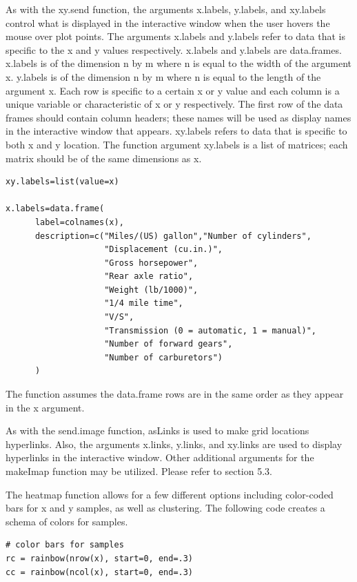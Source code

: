 \documentclass[]{article}
\begin{document}
\indent As with the xy.send function, the arguments x.labels, y.labels, and xy.labels control what is displayed in the interactive window when the user hovers the mouse over plot points. The arguments x.labels and y.labels refer to data that is specific to the x and y values respectively. x.labels and y.labels are data.frames. x.labels is of the dimension n by m where n is equal to the width of the argument x. y.labels is of the dimension n by m where n is equal to the length of the argument x. Each row is specific to a certain x or y value and each column is a unique variable or characteristic of x or y respectively.  The first row of the data frames should contain column headers; these names will be used as display names in the interactive window that appears. xy.labels refers to data that is specific to both x and y location. The function argument xy.labels is a list of matrices; each matrix should be of the same dimensions as x.

\begin{verbatim}
xy.labels=list(value=x)

x.labels=data.frame(
      label=colnames(x),
      description=c("Miles/(US) gallon","Number of cylinders",
                    "Displacement (cu.in.)",
                    "Gross horsepower",
                    "Rear axle ratio",
                    "Weight (lb/1000)",
                    "1/4 mile time",
                    "V/S",
                    "Transmission (0 = automatic, 1 = manual)",
                    "Number of forward gears",
                    "Number of carburetors")
      ) 

\end{verbatim}


 The function assumes the data.frame rows are in the same order as they appear in the x argument.  \newline

\indent As with the send.image function, asLinks is used to make grid locations hyperlinks. Also, the arguments x.links, y.links, and xy.links are used to display hyperlinks in the interactive window. Other additional arguments for the makeImap function may be utilized. Please refer to section 5.3.


\indent The heatmap function allows for a few different options including color-coded bars for x and y samples, as well as clustering. The following code creates a schema of colors for samples. 
\begin{verbatim}
# color bars for samples
rc = rainbow(nrow(x), start=0, end=.3)
cc = rainbow(ncol(x), start=0, end=.3)
\end{verbatim}
\end{document}
